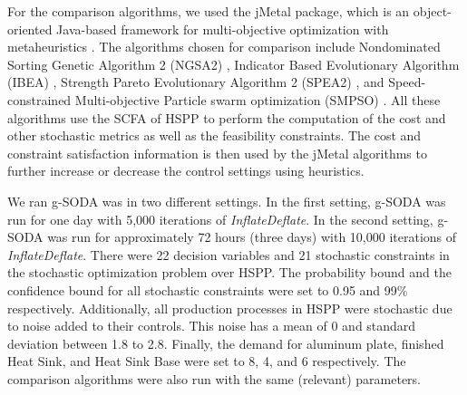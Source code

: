 \documentclass[a4paper, 12pt]{article} %
\begin{document}
For the comparison algorithms, we used the jMetal package, which is an object-oriented Java-based framework for multi-objective optimization with metaheuristics \cite{jMetal}. The algorithms chosen for comparison include Nondominated Sorting Genetic Algorithm 2 (NGSA2) \cite{ngsa2}, Indicator Based Evolutionary Algorithm (IBEA) \cite{ibea}, Strength Pareto Evolutionary Algorithm 2 (SPEA2) \cite{spea2}, and Speed-constrained Multi-objective Particle swarm optimization (SMPSO) \cite{NDG09}.
All these algorithms use the SCFA of HSPP to perform the computation of the cost and other stochastic metrics as well as the feasibility constraints. The cost and constraint satisfaction information is then used by the jMetal algorithms to further increase or decrease the control settings using heuristics.

We ran g-SODA was in two different settings. 
In the first setting, g-SODA was run for one day with 5,000 iterations of \textit{InflateDeflate}. In the second setting, g-SODA was run for approximately 72 hours (three days) with 10,000 iterations of \textit{InflateDeflate}. There were 22 decision variables and 21 stochastic constraints in the stochastic optimization problem over HSPP. The probability bound and the confidence bound for all stochastic constraints were set to 0.95 and 99\% respectively. Additionally, all production processes in HSPP were stochastic due to noise added to their controls. This noise has a mean of 0 and standard deviation between 1.8 to 2.8. 
Finally, the demand for aluminum plate, finished Heat Sink, and Heat Sink Base were set to 8, 4, and 6 respectively.
The comparison algorithms were also run with the same (relevant) parameters.
\end{document}
